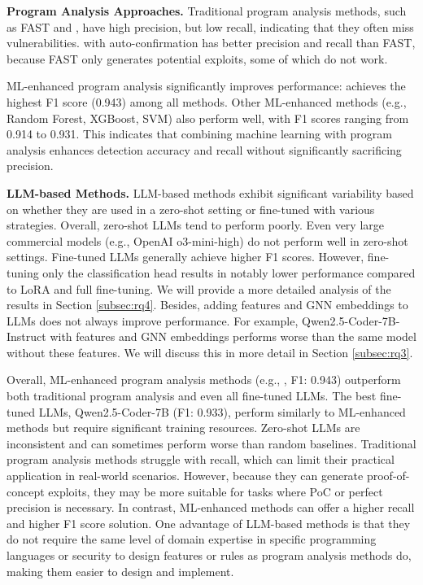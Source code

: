 \documentclass[12pt,openany,oneside,table]{cmuthesis}
\begin{document}
\textbf{Program Analysis Approaches.}
Traditional program analysis methods, such as FAST and \nodemedicfine, have high precision, but low recall, 
indicating that they often miss vulnerabilities. \nodemedicfine with auto-confirmation has better precision and recall than FAST, because FAST only generates potential exploits, some of which do not work.


ML-enhanced program analysis significantly improves performance:
 achieves the highest F1 score (0.943) among all methods.
Other ML-enhanced methods (e.g., Random Forest, XGBoost, SVM) also perform well, with F1 scores ranging from 0.914 to 0.931.
This indicates that combining machine learning with program analysis enhances detection accuracy and recall without significantly sacrificing precision.

\textbf{LLM-based Methods.}
LLM-based methods exhibit significant variability based on whether they are used in a zero-shot setting or fine-tuned with various strategies. Overall, zero-shot LLMs tend to perform poorly. Even very large commercial models (e.g., OpenAI o3-mini-high) do not perform well in zero-shot settings. Fine-tuned LLMs generally achieve higher F1 scores. However, fine-tuning only the classification head results in notably lower performance compared to LoRA and full fine-tuning. We will provide a more detailed analysis of the results in Section \ref{subsec:rq4}. Besides, adding \nodemedicfine features and GNN embeddings to LLMs does not always improve performance. For example, Qwen2.5-Coder-7B-Instruct with \nodemedicfine features and GNN embeddings performs worse than the same model without these features. We will discuss this in more detail in Section \ref{subsec:rq3}. 

Overall, ML-enhanced program analysis methods (e.g., , F1: 0.943) outperform both traditional program analysis and even all fine-tuned LLMs. The best fine-tuned LLMs, Qwen2.5-Coder-7B (F1: 0.933), perform similarly to ML-enhanced methods but require significant training resources. Zero-shot LLMs are inconsistent and can sometimes perform worse than random baselines. Traditional program analysis methods struggle with recall, which can limit their practical application in real-world scenarios. However, because they can generate proof-of-concept exploits, they may be more suitable for tasks where PoC or perfect precision is necessary. In contrast, ML-enhanced methods can offer a higher recall and higher F1 score solution. 
 One advantage of LLM-based methods is that they do not require the same level of domain expertise in specific programming languages or security to design features or rules as program analysis methods do, making them easier to design and implement.
\end{document}
